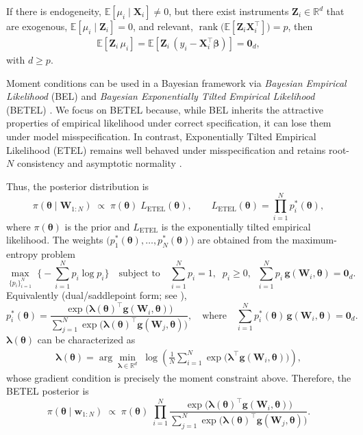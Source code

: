 If there is endogeneity, $\mathbb{E}[\mu_i\mid \mathbf{X}_i]\neq 0$, but there exist instruments $\mathbf{Z}_i\in\mathbb{R}^{d}$ that are exogenous, $\mathbb{E}[\mu_i\mid \mathbf{Z}_i]=0$, and relevant, $\operatorname{rank}\!\big(\mathbb{E}[\mathbf{Z}_i\mathbf{X}_i^{\top}]\big)=p$, then
\begin{align*}
	\mathbb{E}\!\left[\mathbf{Z}_i\,\mu_i\right]
	=\mathbb{E}\!\left[\mathbf{Z}_i\,(y_i-\mathbf{X}_i^{\top}\boldsymbol{\beta})\right]
	=\mathbf{0}_{d},
\end{align*}
with $d\ge p$.

Moment conditions can be used in a Bayesian framework via \emph{Bayesian Empirical Likelihood} (BEL) \cite{lazar2003bel} and \emph{Bayesian Exponentially Tilted Empirical Likelihood} (BETEL) \cite{schennach2005betel}. We focus on BETEL because, while BEL inherits the attractive properties of empirical likelihood under correct specification, it can lose them under model misspecification. In contrast, Exponentially Tilted Empirical Likelihood (ETEL) remains well behaved under misspecification and retains root-$N$ consistency and asymptotic normality \cite{schennach2007etel}.

Thus, the posterior distribution is
\[
\pi(\boldsymbol{\theta}\mid \mathbf{W}_{1:N})
\;\propto\;
\pi(\boldsymbol{\theta})\; L_{\mathrm{ETEL}}(\boldsymbol{\theta}),
\qquad
L_{\mathrm{ETEL}}(\boldsymbol{\theta})=\prod_{i=1}^N p_i^{*}(\boldsymbol{\theta}),
\]
where $\pi(\boldsymbol{\theta})$ is the prior and $L_{\mathrm{ETEL}}$ is the exponentially tilted empirical likelihood. The weights
$\big(p_1^{*}(\boldsymbol{\theta}),\dots,p_N^{*}(\boldsymbol{\theta})\big)$ are obtained from the maximum-entropy problem
\[
\max_{\{p_i\}_{i=1}^N}\;\Big\{-\sum_{i=1}^N p_i\log p_i\Big\}
\quad\text{subject to}\quad
\sum_{i=1}^N p_i=1,\;\; p_i\ge 0,\;\;
\sum_{i=1}^N p_i\,\mathbf{g}(\mathbf{W}_i,\boldsymbol{\theta})=\mathbf{0}_d.
\]
Equivalently (dual/saddlepoint form; see \cite{schennach2005betel,schennach2007etel,chib2018moment}),
\[
p_i^{*}(\boldsymbol{\theta})
=\frac{\exp\!\big(\boldsymbol{\lambda}(\boldsymbol{\theta})^{\top}\mathbf{g}(\mathbf{W}_i,\boldsymbol{\theta})\big)}
{\sum_{j=1}^N \exp\!\big(\boldsymbol{\lambda}(\boldsymbol{\theta})^{\top}\mathbf{g}(\mathbf{W}_j,\boldsymbol{\theta})\big)},
\quad\text{where}\quad
\sum_{i=1}^N p_i^{*}(\boldsymbol{\theta})\,\mathbf{g}(\mathbf{W}_i,\boldsymbol{\theta})=\mathbf{0}_d.
\]
$\boldsymbol{\lambda}(\boldsymbol{\theta})$ can be characterized as
\begin{align}\label{eqLambda}
\boldsymbol{\lambda}(\boldsymbol{\theta})
=\arg\min_{\boldsymbol{\lambda}\in\mathbb{R}^{d}}
\;\log\!\left(\frac{1}{N}\sum_{i=1}^N
\exp\!\big(\boldsymbol{\lambda}^{\top}\mathbf{g}(\mathbf{W}_i,\boldsymbol{\theta})\big)\right),
\end{align}
whose gradient condition is precisely the moment constraint above. Therefore, the BETEL posterior is
\[
\pi(\boldsymbol{\theta}\mid \mathbf{w}_{1:N})
\;\propto\;
\pi(\boldsymbol{\theta})\;
\prod_{i=1}^N
\frac{\exp\!\big(\boldsymbol{\lambda}(\boldsymbol{\theta})^{\top}\mathbf{g}(\mathbf{W}_i,\boldsymbol{\theta})\big)}
{\sum_{j=1}^N \exp\!\big(\boldsymbol{\lambda}(\boldsymbol{\theta})^{\top}\mathbf{g}(\mathbf{W}_j,\boldsymbol{\theta})\big)}.
\]

